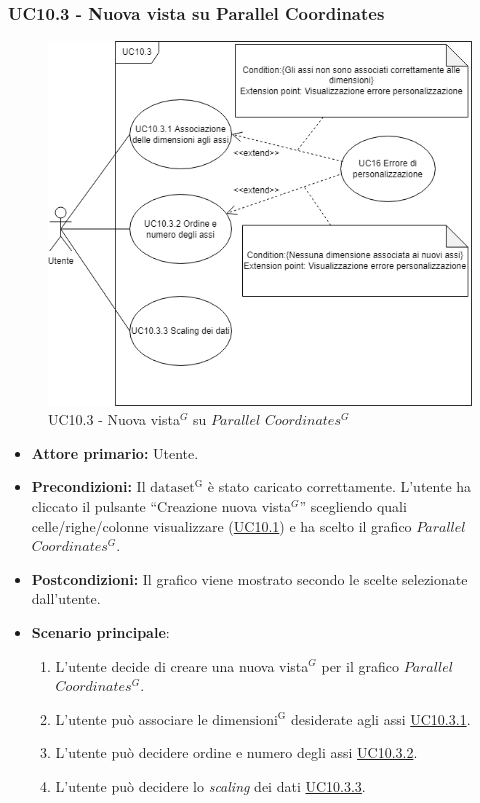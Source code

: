 \subsubsection{UC10.3 - Nuova vista su Parallel Coordinates}
\label{sec:UC10.3}
\begin{figure}[h!]
	\centering
	\includegraphics[scale=0.60]{../../assets/nuova_vista_parallel.png}
	\caption{UC10.3 - Nuova vista$^{G}$ su $Parallel$ $Coordinates^{G}$}
\end{figure}
\begin{itemize}
    \item \textbf{Attore primario:} Utente.
    \item \textbf{Precondizioni:} Il ${\mathrm{dataset^{G}}}$ è stato caricato correttamente. L'utente ha cliccato il pulsante ``Creazione nuova vista$^{G}$'' scegliendo quali celle/righe/colonne visualizzare (\hyperref[sec:UC10.1]{UC10.1}) e ha scelto il grafico $Parallel$ $Coordinates^{G}$.
    \item \textbf{Postcondizioni:} Il grafico viene mostrato secondo le scelte selezionate dall'utente.
    \item \textbf{Scenario principale}:
    \begin{enumerate}
		\item L'utente decide di creare una nuova vista$^{G}$ per il grafico $Parallel$ $Coordinates^{G}$.
		\item L'utente può associare le ${\mathrm{dimensioni^{G}}}$ desiderate agli assi \hyperref[sec:UC10.3.1]{UC10.3.1}.
		\item L'utente può decidere ordine e numero degli assi \hyperref[sec:UC10.3.2]{UC10.3.2}.
		\item L'utente può decidere lo \textit{scaling} dei dati \hyperref[sec:UC10.3.3]{UC10.3.3}.
	\end{enumerate}
\end{itemize}


